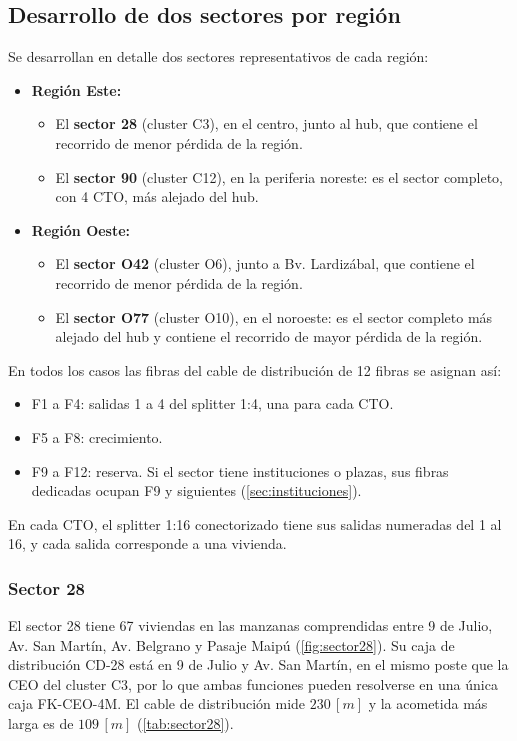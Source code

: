 \subsection{Desarrollo de dos sectores por región}
\label{sec:sectores}
Se desarrollan en detalle dos sectores representativos de cada región:
\begin{itemize}
    \item \textbf{Región Este:}
    \begin{itemize}
        \item El \textbf{sector 28} (cluster C3), en el centro, junto al hub, que contiene el recorrido de menor pérdida de la región.
        \item El \textbf{sector 90} (cluster C12), en la periferia noreste: es el sector completo, con 4 CTO, más alejado del hub.
    \end{itemize}
    \item \textbf{Región Oeste:}
    \begin{itemize}
        \item El \textbf{sector O42} (cluster O6), junto a Bv. Lardizábal, que contiene el recorrido de menor pérdida de la región.
        \item El \textbf{sector O77} (cluster O10), en el noroeste: es el sector completo más alejado del hub y contiene el recorrido de mayor pérdida de la región.
    \end{itemize}
\end{itemize}

En todos los casos las fibras del cable de distribución de 12 fibras se asignan así:
\begin{itemize}
    \item F1 a F4: salidas 1 a 4 del splitter 1:4, una para cada CTO.
    \item F5 a F8: crecimiento.
    \item F9 a F12: reserva. Si el sector tiene instituciones o plazas, sus fibras dedicadas ocupan F9 y siguientes (\autoref{sec:instituciones}).
\end{itemize}
En cada CTO, el splitter 1:16 conectorizado tiene sus salidas numeradas del 1 al 16, y cada salida corresponde a una vivienda.

\subsubsection{Sector 28}
El sector 28 tiene 67 viviendas en las manzanas comprendidas entre 9 de Julio, Av. San Martín, Av. Belgrano y Pasaje Maipú (\autoref{fig:sector28}). Su caja de distribución CD-28 está en 9 de Julio y Av. San Martín, en el mismo poste que la CEO del cluster C3, por lo que ambas funciones pueden resolverse en una única caja FK-CEO-4M. El cable de distribución mide $230 \, [m]$ y la acometida más larga es de $109 \, [m]$ (\autoref{tab:sector28}).

